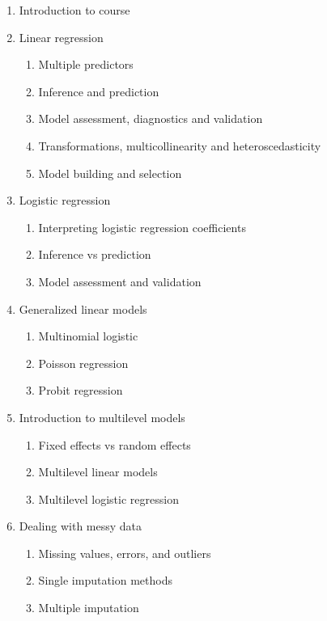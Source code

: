 \documentclass[11pt, a4paper]{article}
\begin{document}
\begin{enumerate}[label= {\color{darkblue}{\ArrowBoldRightStrobe}}]
	\item Introduction to course %
	\item Linear regression %
	\begin{enumerate}[label= {\color{cyan}{\Rectangle}}]
		\item Multiple predictors
		\item Inference and prediction
		\item Model assessment, diagnostics and validation
			\item Transformations, multicollinearity and heteroscedasticity
		\item Model building and selection
	\end{enumerate}
	\item Logistic regression
	\begin{enumerate}[label= {\color{cyan}{\Rectangle}}]
		\item Interpreting logistic regression coefficients
		\item Inference vs prediction
		\item Model assessment and validation
	\end{enumerate}
	\item Generalized linear models
	\begin{enumerate}[label= {\color{cyan}{\Rectangle}}]
		\item Multinomial logistic
		\item Poisson regression
		\item Probit regression
	\end{enumerate}
	\item Introduction to multilevel models
	\begin{enumerate}[label= {\color{cyan}{\Rectangle}}]
		\item Fixed effects vs random effects
		\item Multilevel linear models
		\item Multilevel logistic regression
	\end{enumerate}
	\item Dealing with messy data
	\begin{enumerate}[label= {\color{cyan}{\Rectangle}}]
		\item Missing values, errors, and outliers
		\item Single imputation methods
		\item Multiple imputation

\end{enumerate}
\end{enumerate}
\end{document}
